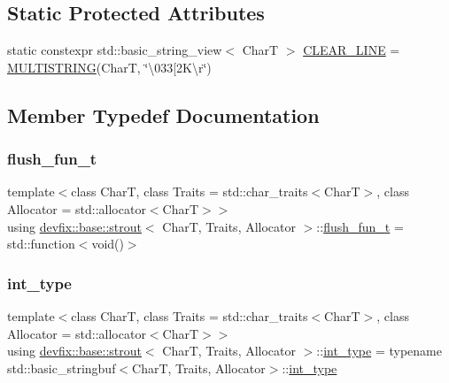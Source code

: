 \subsection*{Static Protected Attributes}
\begin{DoxyCompactItemize}
\item 
static constexpr std\+::basic\+\_\+string\+\_\+view$<$ CharT $>$ \hyperlink{structdevfix_1_1base_1_1strout_afe9d2f4264b508fd02be4af24dba6bb1}{C\+L\+E\+A\+R\+\_\+\+L\+I\+NE} = \hyperlink{strutil_8h_a72f64e8a28f366adf3cad6c109082271}{M\+U\+L\+T\+I\+S\+T\+R\+I\+NG}(CharT, \char`\"{}\textbackslash{}033\mbox{[}2\+K\textbackslash{}r\char`\"{})
\end{DoxyCompactItemize}


\subsection{Member Typedef Documentation}
\mbox{\label{structdevfix_1_1base_1_1strout_ad6cf2897069f246b884fa8d526f8bab1}} 
\subsubsection{\texorpdfstring{flush\+\_\+fun\+\_\+t}{flush\_fun\_t}}
{\footnotesize\ttfamily template$<$class CharT, class Traits = std\+::char\+\_\+traits$<$\+Char\+T$>$, class Allocator = std\+::allocator$<$\+Char\+T$>$$>$ \\
using \hyperlink{structdevfix_1_1base_1_1strout}{devfix\+::base\+::strout}$<$ CharT, Traits, Allocator $>$\+::\hyperlink{structdevfix_1_1base_1_1strout_ad6cf2897069f246b884fa8d526f8bab1}{flush\+\_\+fun\+\_\+t} =  std\+::function$<$void()$>$}

\mbox{\label{structdevfix_1_1base_1_1strout_ac08d70e3105ac2175c26e34818624826}} 
\subsubsection{\texorpdfstring{int\+\_\+type}{int\_type}}
{\footnotesize\ttfamily template$<$class CharT, class Traits = std\+::char\+\_\+traits$<$\+Char\+T$>$, class Allocator = std\+::allocator$<$\+Char\+T$>$$>$ \\
using \hyperlink{structdevfix_1_1base_1_1strout}{devfix\+::base\+::strout}$<$ CharT, Traits, Allocator $>$\+::\hyperlink{structdevfix_1_1base_1_1strout_ac08d70e3105ac2175c26e34818624826}{int\+\_\+type} =  typename std\+::basic\+\_\+stringbuf$<$CharT, Traits, Allocator$>$\+::\hyperlink{structdevfix_1_1base_1_1strout_ac08d70e3105ac2175c26e34818624826}{int\+\_\+type}\hspace{0.3cm}{\ttfamily [protected]}}

